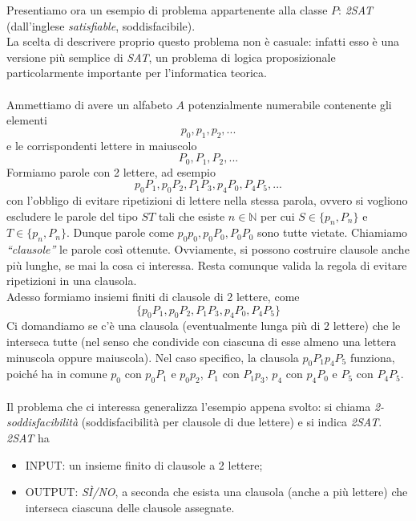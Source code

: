 \documentclass[12pt,a4paper]{report}
\theoremstyle{definition}
\begin{document}
Presentiamo ora un esempio di problema appartenente alla classe $P$: \emph{2SAT} (dall'inglese \emph{satisfiable}, soddisfacibile).\\
La scelta di descrivere proprio questo problema non è casuale: infatti esso è una versione più semplice di \emph{SAT}, un problema di logica proposizionale particolarmente importante per l'informatica teorica.\\
\\
Ammettiamo di avere un alfabeto $A$ potenzialmente numerabile contenente gli elementi
$$p_0, p_1, p_2,...$$
e le corrispondenti lettere in maiuscolo
$$P_0, P_1, P_2,...$$
Formiamo parole con 2 lettere, ad esempio
$$p_0 P_1, p_0 P_2, P_1 P_3, p_4 P_0, P_4 P_5,...$$
con l'obbligo di evitare ripetizioni di lettere nella stessa parola, ovvero si vogliono escludere le parole del tipo $ST$ tali che esiste $n \in \mathbb{N}$ per cui $S \in \{p_n, P_n\}$ e $T \in \{p_n, P_n\}$. Dunque parole come $p_0 p_0, p_0 P_0, P_0 P_0$ sono tutte vietate. Chiamiamo \emph{``clausole''} le parole così ottenute. Ovviamente, si possono costruire clausole anche più lunghe, se mai la cosa ci interessa. Resta comunque valida la regola di evitare ripetizioni in una clausola.\\
Adesso formiamo insiemi finiti di clausole di 2 lettere, come
$$\{p_0 P_1, p_0 P_2, P_1 P_3, p_4 P_0, P_4 P_5\}$$
Ci domandiamo se c'è una clausola (eventualmente lunga più di 2 lettere) che le interseca tutte (nel senso che condivide con ciascuna di esse almeno una lettera minuscola oppure maiuscola). Nel caso specifico, la clausola $p_0 P_1 p_4 P_5$ funziona, poiché ha in comune $p_0$ con $p_0 P_1$ e $p_0 p_2$, $P_1$ con $P_1 p_3$, $p_4$ con $p_4 P_0$ e $P_5$ con $P_4 P_5$.\\
\\
Il problema che ci interessa generalizza l'esempio appena svolto: si chiama \emph{2-soddisfacibilità} (soddisfacibilità per clausole di due lettere) e si indica \emph{2SAT}. \emph{2SAT} ha
\begin{itemize}
\item INPUT: un insieme finito di clausole a 2 lettere;
\item OUTPUT: \emph{SÌ/NO}, a seconda che esista una clausola (anche a più lettere) che interseca ciascuna delle clausole assegnate.
\end{itemize}
\end{document}
